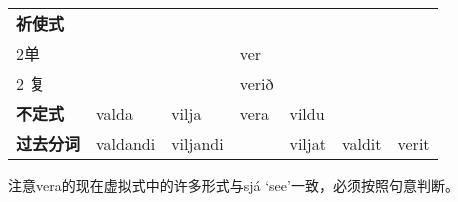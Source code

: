\begin{longtable}{llll|lll}
    \textbf{祈使式}   &          &            & \multicolumn{1}{r}{ } &        &                    &                          \\
    2单               &          &            & ver                   &        &                    &                          \\
    2 复              &          &            & verið                 &        &                    &                          \\
    \textbf{不定式}   & valda    & vilja      & vera                  & vildu  &                    &                          \\
    \textbf{过去分词} & valdandi & viljandi   &                       & viljat & valdit             & verit                    \\
\end{longtable}

注意vera的现在虚拟式中的许多形式与sjá `see‌'一致，必须按照句意判断。

